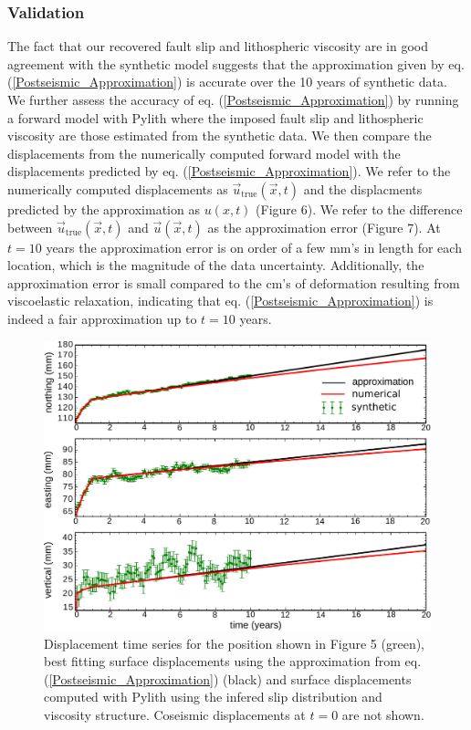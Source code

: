 \documentclass[extra,mreferee]{gji}
\begin{document}
\subsubsection{Validation}
The fact that our recovered fault slip and lithospheric viscosity are
in good agreement with the synthetic model suggests that the
approximation given by eq. (\ref{Postseismic_Approximation}) is
accurate over the 10 years of synthetic data.  We further assess the accuracy
of eq. (\ref{Postseismic_Approximation}) by running a forward model
with Pylith where the imposed fault slip and lithospheric viscosity
are those estimated from the synthetic data.  We then compare the
displacements from the numerically computed forward model with the
displacements predicted by eq. (\ref{Postseismic_Approximation}).  We
refer to the numerically computed displacements as
$\vec{u}_{\mathrm{true}}(\vec{x},t)$ and the displacments predicted by the
approximation as $u(x,t)$ (Figure 6).  We refer to the
difference between $\vec{u}_{\mathrm{true}}(\vec{x},t)$ and $\vec{u}(\vec{x},t)$
as the approximation error (Figure 7). At $t=10$ years the
approximation error is on order of a few mm's in length for each
location, which is the magnitude of the data uncertainty.
Additionally, the approximation error is small compared to the
cm's of deformation resulting from viscoelastic relaxation, indicating
that eq. (\ref{Postseismic_Approximation}) is indeed a fair
approximation up to $t=10$ years.  

\begin{figure}\label{figure6}
  \centering
  \includegraphics[scale=0.6]{FinalFigures/Figure5.pdf}
  \caption{Displacement time series for the position shown in Figure 5
    (green), best fitting surface displacements using the
    approximation from eq. (\ref{Postseismic_Approximation}) (black)
    and surface displacements computed with Pylith using the infered
    slip distribution and viscosity structure. Coseismic displacements
    at $t=0$ are not shown.}
  \label{Figure 6}
\end{figure}
\end{document}
